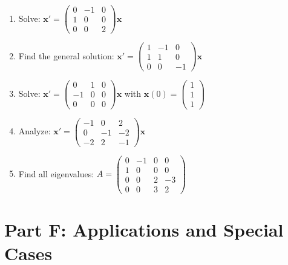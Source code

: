 \documentclass[12pt]{article}
\begin{document}
\begin{enumerate}[start=21]
\item Solve: $\mathbf{x}' = \begin{pmatrix} 0 & -1 & 0 \\ 1 & 0 & 0 \\ 0 & 0 & 2 \end{pmatrix}\mathbf{x}$

\item Find the general solution: $\mathbf{x}' = \begin{pmatrix} 1 & -1 & 0 \\ 1 & 1 & 0 \\ 0 & 0 & -1 \end{pmatrix}\mathbf{x}$

\item Solve: $\mathbf{x}' = \begin{pmatrix} 0 & 1 & 0 \\ -1 & 0 & 0 \\ 0 & 0 & 0 \end{pmatrix}\mathbf{x}$ with $\mathbf{x}(0) = \begin{pmatrix} 1 \\ 1 \\ 1 \end{pmatrix}$

\item Analyze: $\mathbf{x}' = \begin{pmatrix} -1 & 0 & 2 \\ 0 & -1 & -2 \\ -2 & 2 & -1 \end{pmatrix}\mathbf{x}$

\item Find all eigenvalues: $A = \begin{pmatrix} 0 & -1 & 0 & 0 \\ 1 & 0 & 0 & 0 \\ 0 & 0 & 2 & -3 \\ 0 & 0 & 3 & 2 \end{pmatrix}$
\end{enumerate}

\section*{Part F: Applications and Special Cases}
\end{document}
